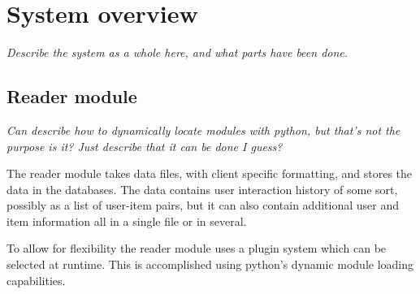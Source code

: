 
\section{System overview}\label{sec:res:sys}

\textit{Describe the system as a whole here, and what parts have been done.}



%
%


\subsection{Reader module}

\textit{Can describe how to dynamically locate modules with python, but that's not the purpose is it? Just describe that it can be done I guess?}

The reader module takes data files, with client specific formatting, and stores the data in the databases. The data contains user interaction history of some sort, possibly as a list of user-item pairs, but it can also contain additional user and item information all in a single file or in several.

To allow for flexibility the reader module uses a plugin system which can be selected at runtime. This is accomplished using python's dynamic module loading capabilities.

